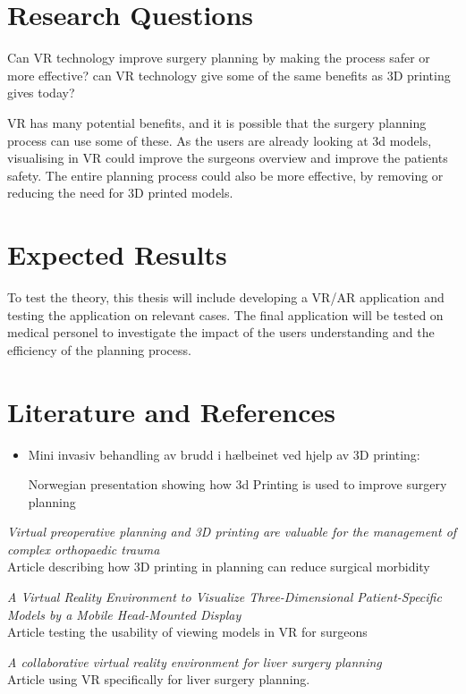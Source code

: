 \documentclass[11pt]{scrartcl}
\begin{document}
\section{Research Questions}

Can VR technology improve surgery planning by making the process safer or more effective?
can VR technology give some of the same benefits as 3D printing gives today?

VR has many potential benefits, and it is possible that the surgery planning process can use some of these. As the users are already looking at 3d models, visualising in VR could improve the surgeons overview and improve the patients safety. The entire planning process could also be more effective, by removing or reducing the need for 3D printed models.

\section{Expected Results}
To test the theory, this thesis will include developing a VR/AR application and testing the application on relevant cases.
The final application will be tested on medical personel to investigate the impact of the users understanding and the efficiency of the planning process. 

\section{Literature and References}
\begin{itemize}
\item Mini invasiv behandling av brudd i hælbeinet ved hjelp av 3D printing:
\begin{description}
Norwegian presentation showing how 3d Printing is used to improve surgery planning
\end{description}
\end{itemize}


\emph{Virtual preoperative planning and 3D printing are valuable for the management of complex orthopaedic trauma}\\
Article describing how 3D printing in planning can reduce surgical morbidity


\emph{A Virtual Reality Environment to Visualize Three-Dimensional Patient-Specific Models by a Mobile Head-Mounted Display}\\
Article testing the usability of viewing models in VR for surgeons


\emph{A collaborative virtual reality environment for liver surgery planning}\\
Article using VR specifically for liver surgery planning.
\end{document}
